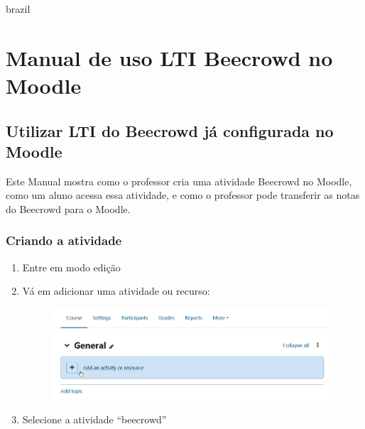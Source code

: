 \begin{otherlanguage*}{brazil}

\chapter{Manual de uso LTI Beecrowd no Moodle}
\label{manual:uso-lti}

\section{Utilizar LTI do Beecrowd já configurada no Moodle}

Este Manual mostra como o professor cria uma atividade Beecrowd no Moodle, como um aluno acessa essa atividade, e como o professor pode transferir as notas do Beecrowd para o Moodle.

\subsection{Criando a atividade}

\begin{enumerate}
    \item Entre em modo edição
    \item Vá em adicionar uma atividade ou recurso:

    \begin{figure}[H]
        \centering
            \includegraphics[scale=0.45]{pictures/apendices/apendice_b_1.png}
    \end{figure}

    \item Selecione a atividade “beecrowd”


\end{enumerate}
\end{otherlanguage*}
